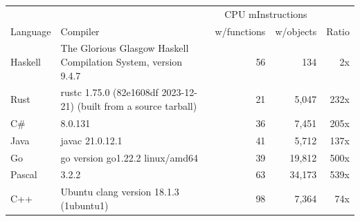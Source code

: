 \documentclass{article}
\begin{document}
      \begin{tabularx}{\linewidth}{lXrrr}
      \toprule
        & & \multicolumn{2}{c}{CPU mInstructions} & \\
        Language & Compiler & w/functions & w/objects & Ratio \\
      \midrule
    Haskell & The Glorious Glasgow Haskell Compilation System, version 9.4.7 & 56 & 134 & 2x \\
Rust & rustc 1.75.0 (82e1608df 2023-12-21) (built from a source tarball) & 21 & 5,047 & 232x \\
C\# & 8.0.131 & 36 & 7,451 & 205x \\
Java & javac 21.0.12.1 & 41 & 5,712 & 137x \\
Go & go version go1.22.2 linux/amd64 & 39 & 19,812 & 500x \\
Pascal & 3.2.2 & 63 & 34,173 & 539x \\
C++ & Ubuntu clang version 18.1.3 (1ubuntu1) & 98 & 7,364 & 74x \\

      \bottomrule
      \end{tabularx}
      
\end{document}
